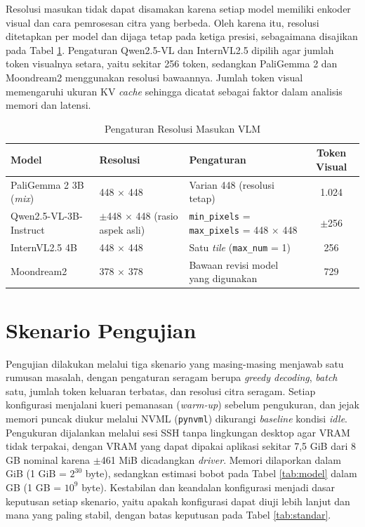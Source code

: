Resolusi masukan tidak dapat disamakan karena setiap model memiliki enkoder visual dan cara pemrosesan citra yang berbeda. Oleh karena itu, resolusi ditetapkan per model dan dijaga tetap pada ketiga presisi, sebagaimana disajikan pada Tabel \ref{tab:resolusi}. Pengaturan Qwen2.5-VL dan InternVL2.5 dipilih agar jumlah token visualnya setara, yaitu sekitar 256 token, sedangkan PaliGemma 2 dan Moondream2 menggunakan resolusi bawaannya. Jumlah token visual memengaruhi ukuran KV \textit{cache} sehingga dicatat sebagai faktor dalam analisis memori dan latensi.

\begin{table}[H]
    \centering
    \caption{Pengaturan Resolusi Masukan VLM}
    \label{tab:resolusi}
    \renewcommand{\arraystretch}{1.3}
    \begin{tabular}{|p{3.4cm}|p{2.6cm}|p{4.4cm}|c|}
    \hline
    \textbf{Model} & \textbf{Resolusi} & \textbf{Pengaturan} & \textbf{Token Visual} \\
    \hline
    PaliGemma 2 3B (\textit{mix}) & 448 $\times$ 448 & Varian 448 (resolusi tetap) & 1.024 \\
    \hline
    Qwen2.5-VL-3B-Instruct & $\pm$448 $\times$ 448 (rasio aspek asli) & \texttt{min\_pixels} = \texttt{max\_pixels} = 448 $\times$ 448 & $\pm$256 \\
    \hline
    InternVL2.5 4B & 448 $\times$ 448 & Satu \textit{tile} (\texttt{max\_num} = 1) & 256 \\
    \hline
    Moondream2 & 378 $\times$ 378 & Bawaan revisi model yang digunakan & 729 \\
    \hline
    \end{tabular}
\end{table}

\section{Skenario Pengujian}
\label{sec:skenario}
Pengujian dilakukan melalui tiga skenario yang masing-masing menjawab satu rumusan masalah, dengan pengaturan seragam berupa \textit{greedy decoding}, \textit{batch} satu, jumlah token keluaran terbatas, dan resolusi citra seragam. Setiap konfigurasi menjalani kueri pemanasan (\textit{warm-up}) sebelum pengukuran, dan jejak memori puncak diukur melalui NVML (\texttt{pynvml}) dikurangi \textit{baseline} kondisi \textit{idle}. Pengukuran dijalankan melalui sesi SSH tanpa lingkungan desktop agar VRAM tidak terpakai, dengan VRAM yang dapat dipakai aplikasi sekitar 7,5 GiB dari 8 GB nominal karena $\pm$461 MiB dicadangkan \textit{driver}. Memori dilaporkan dalam GiB (1 GiB = $2^{30}$ byte), sedangkan estimasi bobot pada Tabel \ref{tab:model} dalam GB (1 GB = $10^{9}$ byte). Kestabilan dan keandalan konfigurasi menjadi dasar keputusan setiap skenario, yaitu apakah konfigurasi dapat diuji lebih lanjut dan mana yang paling stabil, dengan batas keputusan pada Tabel \ref{tab:standar}.

